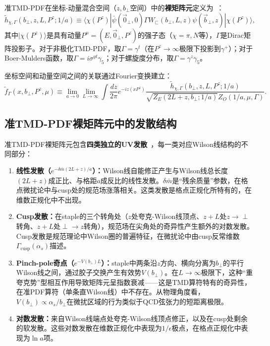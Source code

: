 \documentclass[12pt,a4paper]{ctexart}
\theoremstyle{definition}
\begin{document}
准TMD-PDF在坐标-动量混合空间（$z, b_\perp$空间）中的\textbf{裸矩阵元}定义为~\cite{Zhang2022renormTMD}：
\begin{equation}
\tilde{h}_{\chi,\Gamma}(b_\perp, z, L, P^z; 1/a) \equiv \langle \chi(P^z) | \bar{\psi}(\vec{0}_\perp, 0) \Gamma W_{\sqsubset}(b_\perp, L, z) \psi(\vec{b}_\perp, z) | \chi(P^z) \rangle,
\label{eq:bare_matrix}
\end{equation}
其中$|\chi(P^z)\rangle$是具有动量$P^\mu = (E, \vec{0}_\perp, P^z)$的强子态（$\chi = \pi, N$等），$\Gamma$是Dirac矩阵投影子。对于非极化TMD-PDF，取$\Gamma = \gamma^t$（在$P^z \to \infty$极限下投影到$\gamma^+$）；对于Boer-Mulders函数，取$\Gamma = i\sigma^{yt}\gamma_5$；对于螺旋度分布，取$\Gamma = \gamma^z\gamma_5$。

坐标空间和动量空间之间的关联通过Fourier变换建立：
\begin{equation}
\tilde{f}_\Gamma(x, b_\perp, P^z, \mu) \equiv \lim_{a\to 0} \lim_{L\to\infty} \int \frac{dz}{2\pi} e^{-iz(xP^z)} \frac{\tilde{h}_{\chi,\Gamma}(b_\perp, z, L, P^z; 1/a)}{\sqrt{Z_E(2L+z, b_\perp; 1/a)} Z_O(1/a, \mu, \Gamma)}.
\label{eq:fourier_TMD}
\end{equation}

\subsection{准TMD-PDF裸矩阵元中的发散结构}

准TMD-PDF裸矩阵元包含\textbf{四类独立的UV发散}~\cite{Zhang2022renormTMD}，每一类对应Wilson线结构的不同部分：

\begin{enumerate}[leftmargin=*]
    \item \textbf{线性发散（$e^{-\delta\bar{m}(2L+z)/a}$）：}Wilson线自能修正产生与Wilson线总长度$(2L+z)$成正比、与格距$a$成反比的线性发散。$\delta\bar{m}$是``残余质量''参数，在格点微扰论中与cusp处的规范场涨落相关。这类发散是格点正规化所特有的，在维数正规化中不出现。

    \item \textbf{Cusp发散：}在staple的三个转角处（$z$处夸克-Wilson线顶点、$z+L$处$z\to\perp$转角、$z+L$处$\perp\to z$转角），规范场在尖角处的奇异性产生额外的对数发散。Cusp发散是规范理论中Wilson圈的普遍特征，在微扰论中由cusp反常维数$\Gamma_{\text{cusp}}(\alpha_s)$描述。

    \item \textbf{Pinch-pole奇点（$e^{-V(b_\perp)L}$）：}staple中两条沿$z$方向、横向分离为$b_\perp$的平行Wilson线之间，通过胶子交换产生有效势$V(b_\perp)$。在$L\to\infty$极限下，这种``重夸克势''型相互作用导致矩阵元呈指数衰减——这是TMD算符特有的奇异性，在准PDF算符（单条直Wilson线）中不存在。从物理角度看，$V(b_\perp) \propto \alpha_s/b_\perp$在微扰区域的行为类似于QCD弦张力的短距离极限。

    \item \textbf{对数发散：}来自Wilson线端点处夸克-Wilson线顶点修正，以及在cusp处剩余的软发散。这些对数发散在维数正规化中表现为$1/\epsilon$极点，在格点正规化中表现为$\ln a$项。
\end{enumerate}
\end{document}
